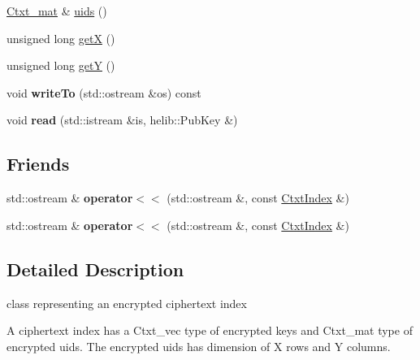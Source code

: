 \begin{DoxyCompactItemize}
\item 
\hyperlink{namespaceHDB__supergate___a46a3fb2b98c95dc7615203376c4ad0c8}{Ctxt\+\_\+mat} \& \hyperlink{classHDB__supergate___1_1CtxtIndex_a928f500292b531aac98d86fb4e3511ec}{uids} ()
\item 
unsigned long \hyperlink{classHDB__supergate___1_1CtxtIndex_ad3ee6eaf8a48319e153f30a6914dc6a9}{getX} ()
\item 
unsigned long \hyperlink{classHDB__supergate___1_1CtxtIndex_a1982acce75987d7a292341d5af81f1fd}{getY} ()
\item 
\mbox{\label{classHDB__supergate___1_1CtxtIndex_a8766dc2600531ae78e8434df581eb42d}} 
void {\bfseries write\+To} (std\+::ostream \&os) const
\item 
\mbox{\label{classHDB__supergate___1_1CtxtIndex_a07894a32a19b27cae1f189dc74353565}} 
void {\bfseries read} (std\+::istream \&is, helib\+::\+Pub\+Key \&)
\end{DoxyCompactItemize}
\subsection*{Friends}
\begin{DoxyCompactItemize}
\item 
\mbox{\label{classHDB__supergate___1_1CtxtIndex_aaaf1a78c02078069142df1254f3fcc00}} 
std\+::ostream \& {\bfseries operator$<$$<$} (std\+::ostream \&, const \hyperlink{classHDB__supergate___1_1CtxtIndex}{Ctxt\+Index} \&)
\item 
\mbox{\label{classHDB__supergate___1_1CtxtIndex_aaaf1a78c02078069142df1254f3fcc00}} 
std\+::ostream \& {\bfseries operator$<$$<$} (std\+::ostream \&, const \hyperlink{classHDB__supergate___1_1CtxtIndex}{Ctxt\+Index} \&)
\end{DoxyCompactItemize}


\subsection{Detailed Description}
class representing an encrypted ciphertext index 

A ciphertext index has a Ctxt\+\_\+vec type of encrypted keys and Ctxt\+\_\+mat type of encrypted uids. The encrypted uids has dimension of X rows and Y columns. 

